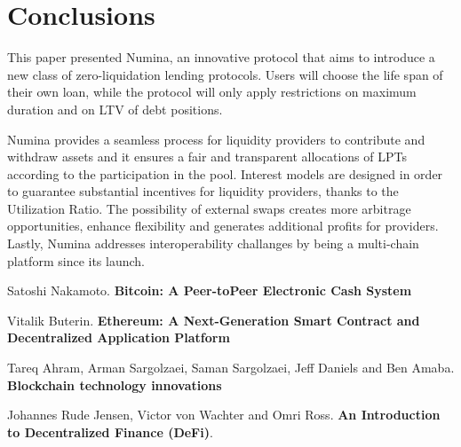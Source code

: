 \documentclass[12pt]{paper}
\begin{document}
\section{Conclusions}
\label{sec:conclusions}
	This paper presented Numina, an innovative protocol that aims to introduce a new class of zero-liquidation lending protocols. Users will choose the life span of their own loan, while the protocol will only apply restrictions on maximum duration and on LTV of debt positions.
	\par Numina provides a seamless process for liquidity providers to contribute and withdraw assets and it ensures a fair and transparent allocations of LPTs according to the participation in the pool. Interest models are designed in order to guarantee substantial incentives for liquidity providers, thanks to the Utilization Ratio. The possibility of external swaps creates more arbitrage opportunities, enhance flexibility and generates additional profits for providers. Lastly, Numina addresses interoperability challanges by being a multi-chain platform since its launch.
	
\begin{thebibliography}{99}
	 Satoshi Nakamoto. \textbf{Bitcoin: A Peer-toPeer Electronic Cash System}
	
	  Vitalik Buterin. \textbf{Ethereum: A Next-Generation Smart Contract and Decentralized Application Platform}
	
	 Tareq Ahram, Arman Sargolzaei, Saman Sargolzaei, Jeff Daniels and Ben Amaba. \textbf{Blockchain technology innovations}
	
	 Johannes Rude Jensen, Victor von Wachter and Omri Ross. \textbf{An Introduction to Decentralized Finance (DeFi)}.
	
\end{thebibliography}
\end{document}
